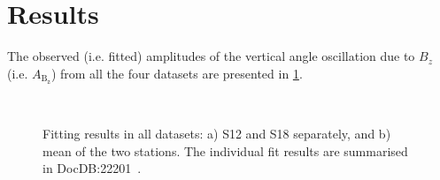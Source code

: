 \documentclass[12pt]{article}
\begin{document}
\clearpage
\thispagestyle{plain}
\section{Results}
The observed (i.e. fitted) amplitudes of the vertical angle oscillation due to $B_z$ (i.e. $A_{\mathrm{B_z}}$) from all the four  datasets are presented in \cref{fig:bz}.

\begin{figure}[htpb]
    \centering
     \\  
    \vspace{-0.2cm}
    \caption{Fitting results in all  datasets: a) S12 and S18 separately, and b) mean of the two stations. The individual fit results are summarised in DocDB:22201~\cite{Gleb_docdb}.}
    \label{fig:bz}
\end{figure}
\end{document}
